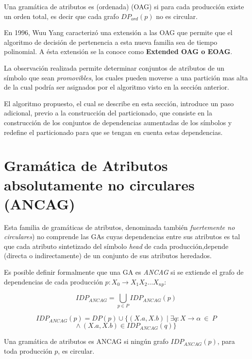 \begin{definition} Una gramática de atributos es (ordenada) (OAG) si para cada producción existe un orden total, es decir que cada grafo $ DP_{ord}(p) $ no es circular.
\end{definition}

En 1996, Wuu Yang\cite{XXX} caracterizó una extensión a las OAG que permite que el algoritmo de decisión de pertenencia a esta nueva familia sea de tiempo polinomial. A ésta extensión se la conoce como \textbf{Extended OAG o EOAG}.

La observación realizada permite determinar conjuntos de atributos de un símbolo que sean \emph{promovibles}, los cuales pueden moverse a una partición mas alta de la cual podría ser asignados por el algoritmo visto en la sección anterior.

El algoritmo propuesto, el cual se describe en esta sección, introduce un paso adicional, previo a la construcción del particionado, que consiste en la construcción de los conjuntos de dependencias aumentadas de los símbolos y redefine el particionado para que se tengan en cuenta estas dependencias.

\section{Gramática de Atributos absolutamente no circulares (ANCAG)}

Esta familia de gramáticas de atributos, denominada también \emph{fuertemente no circulares}) no comprende las GAs cuyas dependencias entre sus atributos es tal que cada atributo sintetizado del símbolo \textit{head} de cada producción,depende (directa o indirectamente) de un conjunto de sus atributos heredados.

Es posible definir formalmente que una GA es \emph{ANCAG} si se extiende el grafo de dependencias de cada producción $p: X_0 \rightarrow X_1 X_2 \ldots X_{np}$:

$$ IDP_{ANCAG} = \bigcup_{p \in P} IDP_{ANCAG}(p) $$

$$ IDP_{ANCAG}(p) = DP(p) \cup \{ (X.a,X.b) \mid
                             \exists q: X \rightarrow \alpha \: \in \: P $$
                $$ \land \: (X.a,X.b) \in IDP_{ANCAG}(q) \} $$

\begin{definition} Una gramática de atributos es ANCAG si ningún grafo $ IDP_{ANCAG}(p) $, para toda producción $p$, es circular.
\end{definition}

